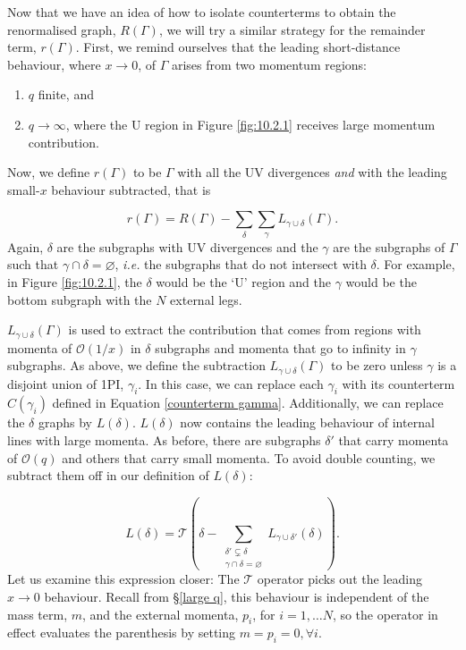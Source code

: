 \documentclass{article}
\begin{document}
Now that we have an idea of how to isolate counterterms to obtain the renormalised graph, $R(\Gamma)$, we will try a similar strategy for the remainder term, $r(\Gamma)$. First, we remind ourselves that the leading short-distance behaviour, where $x\rightarrow 0$, of $\Gamma$ arises from two momentum regions:

\begin{enumerate}
    \item $q$ finite, and
    \item $q\rightarrow \infty$, where the U region in Figure \ref{fig:10.2.1} receives large momentum contribution.
\end{enumerate}

Now, we define $r(\Gamma)$ to be $\Gamma$ with all the UV divergences \textit{and} with the leading small-$x$ behaviour subtracted, that is

\begin{equation} \label{small_r}
    r(\Gamma) = R(\Gamma) - \sum_\delta \sum_\gamma L_{\gamma \cup \delta}(\Gamma).
\end{equation}
Again, $\delta$ are the subgraphs with UV divergences and the $\gamma$ are the subgraphs of $\Gamma$ such that $\gamma\cap\delta=\varnothing$, \textit{i.e.} the subgraphs that do not intersect with $\delta$. For example, in Figure \ref{fig:10.2.1}, the $\delta$ would be the `U' region and the $\gamma$ would be the bottom subgraph with the $N$ external legs. 

$L_{\gamma\cup\delta}(\Gamma)$ is used to extract the contribution that comes from regions with momenta of $\mathcal{O}(1/x)$ in $\delta$ subgraphs and momenta that go to infinity in $\gamma$ subgraphs. As above, we define the subtraction $L_{\gamma\cup\delta}(\Gamma)$ to be zero unless $\gamma$ is a disjoint union of 1PI, $\gamma_i$. In this case, we can replace each $\gamma_i$ with its counterterm $C(\gamma_i)$ defined in Equation \ref{counterterm gamma}. Additionally, we can replace the $\delta$ graphs by $L(\delta)$. $L(\delta)$ now contains the leading behaviour of internal lines with large momenta. As before, there are subgraphs $\delta'$ that carry momenta of $\mathcal{O}(q)$ and others that carry small momenta. To avoid double counting, we subtract them off in our definition of $L(\delta)$:

\begin{equation} \label{largeQ_recursion}
    L(\delta) = \mathcal{T} \left( \delta - \sum_{\substack{\delta'\varsubsetneq \delta \\ \gamma\cap\delta = \varnothing }} L_{\gamma\cup\delta'}(\delta) \right).
\end{equation}
Let us examine this expression closer:  The $\mathcal{T}$ operator picks out the leading $x\rightarrow 0$ behaviour. Recall from \S\ref{large q}, this behaviour is independent of the mass term, $m$, and the external momenta, $p_i$, for $i=1,\dots N$, so the operator in effect evaluates the parenthesis by setting $m=p_i=0, \forall i$.
\end{document}
